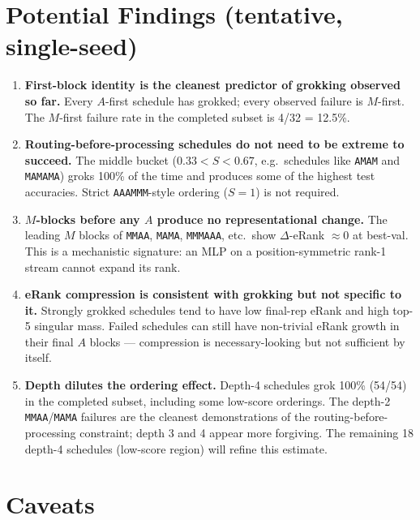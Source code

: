 \documentclass[10pt]{article}
\begin{document}
\section{Potential Findings (tentative, single-seed)}

\begin{enumerate}
\item \textbf{First-block identity is the cleanest predictor of grokking observed so far.} Every $A$-first schedule has grokked; every observed failure is $M$-first. The $M$-first failure rate in the completed subset is 4/32 = 12.5\%.

\item \textbf{Routing-before-processing schedules do not need to be extreme to succeed.} The middle bucket ($0.33 < S < 0.67$, e.g.\ schedules like \texttt{AMAM} and \texttt{MAMAMA}) groks 100\% of the time and produces some of the highest test accuracies. Strict \texttt{AAAMMM}-style ordering ($S=1$) is not required.

\item \textbf{$M$-blocks before any $A$ produce no representational change.} The leading $M$ blocks of \texttt{MMAA}, \texttt{MAMA}, \texttt{MMMAAA}, etc.\ show $\Delta\!$-eRank $\approx 0$ at best-val. This is a mechanistic signature: an MLP on a position-symmetric rank-1 stream cannot expand its rank.

\item \textbf{eRank compression is consistent with grokking but not specific to it.} Strongly grokked schedules tend to have low final-rep eRank and high top-5 singular mass. Failed schedules can still have non-trivial eRank growth in their final $A$ blocks --- compression is necessary-looking but not sufficient by itself.

\item \textbf{Depth dilutes the ordering effect.} Depth-4 schedules grok 100\% (54/54) in the completed subset, including some low-score orderings. The depth-2 \texttt{MMAA}/\texttt{MAMA} failures are the cleanest demonstrations of the routing-before-processing constraint; depth 3 and 4 appear more forgiving. The remaining 18 depth-4 schedules (low-score region) will refine this estimate.
\end{enumerate}

\section{Caveats}
\end{document}
